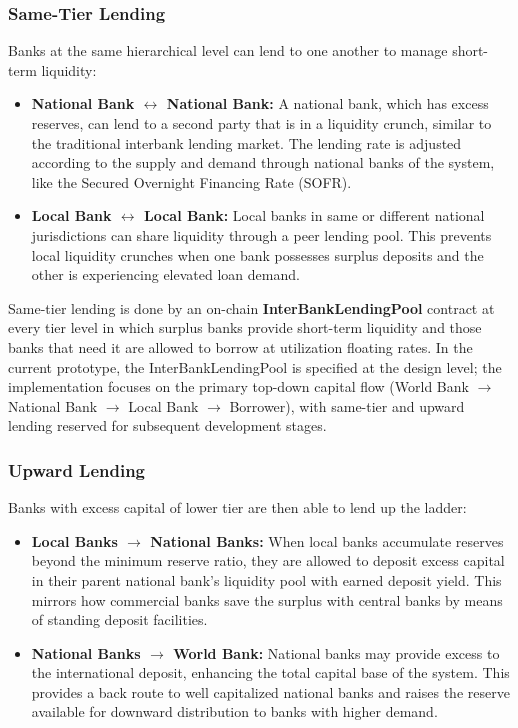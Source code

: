 \documentclass[12pt,a4paper]{report}
\begin{document}
\subsubsection{Same-Tier Lending}

Banks at the same hierarchical level can lend to one another to manage short-term liquidity:

\begin{itemize}[noitemsep]
\item \textbf{National Bank $\leftrightarrow$ National Bank:} A national bank, which has excess reserves, can lend to a second party that is in a liquidity crunch, similar to the traditional interbank lending market. The lending rate is adjusted according to the supply and demand through national banks of the system, like the Secured Overnight Financing Rate (SOFR).
\item \textbf{Local Bank $\leftrightarrow$ Local Bank:} Local banks in same or different national jurisdictions can share liquidity through a peer lending pool. This prevents local liquidity crunches when one bank possesses surplus deposits and the other is experiencing elevated loan demand.
\end{itemize}

Same-tier lending is done by an on-chain \textbf{InterBankLendingPool} contract at every tier level in which surplus banks provide short-term liquidity and those banks that need it are allowed to borrow at utilization floating rates. In the current prototype, the InterBankLendingPool is specified at the design level; the implementation focuses on the primary top-down capital flow (World Bank $\to$ National Bank $\to$ Local Bank $\to$ Borrower), with same-tier and upward lending reserved for subsequent development stages.

\subsubsection{Upward Lending}

Banks with excess capital of lower tier are then able to lend up the ladder:

\begin{itemize}[noitemsep]
\item \textbf{Local Banks $\to$ National Banks:} When local banks accumulate reserves beyond the minimum reserve ratio, they are allowed to deposit excess capital in their parent national bank's liquidity pool with earned deposit yield. This mirrors how commercial banks save the surplus with central banks by means of standing deposit facilities.
\item \textbf{National Banks $\to$ World Bank:} National banks may provide excess to the international deposit, enhancing the total capital base of the system. This provides a back route to well capitalized national banks and raises the reserve available for downward distribution to banks with higher demand.
\end{itemize}
\end{document}
